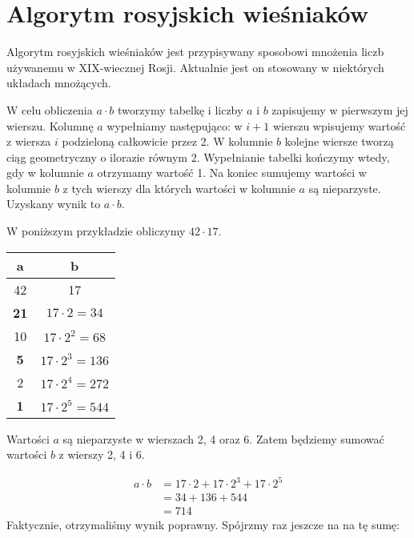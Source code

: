 \section{Algorytm rosyjskich wieśniaków}

\label{sec:wiesniakow}

Algorytm rosyjskich wieśniaków jest przypisywany sposobowi mnożenia liczb używanemu w XIX-wiecznej Rosji.
Aktualnie jest on stosowany w niektórych układach mnożących.

W celu obliczenia $a \cdot b$ tworzymy tabelkę i liczby $a$ i $b$ zapisujemy w pierwszym jej wierszu.
Kolumnę $a$ wypełniamy następująco: w $i+1$ wierszu wpisujemy wartość z wiersza $i$ podzieloną całkowicie przez 2.
W kolumnie $b$ kolejne wiersze tworzą ciąg geometryczny o ilorazie równym 2.
Wypełnianie tabelki kończymy wtedy, gdy w kolumnie $a$ otrzymamy wartość 1.
Na koniec sumujemy wartości w kolumnie $b$ z tych wierszy dla których wartości w kolumnie $a$ są nieparzyste.
Uzyskany wynik to $a \cdot b$.

W poniższym przykładzie obliczymy $42 \cdot 17$.

\begin{center}
\begin{tabular}{ c|c } 

 a & b \\ 
 \hline
 42 & 17 \\ 
 \textbf{21} & $17 \cdot 2 = 34$ \\
 10 & $17 \cdot 2^2 = 68$ \\
 \textbf{5}  & $17 \cdot 2^3 = 136$ \\
 2  & $17 \cdot 2^4 = 272$ \\
 \textbf{1}  & $17 \cdot 2^5 = 544$ \\

\end{tabular}
\end{center}
Wartości $a$ są nieparzyste w wierszach 2, 4 oraz 6. Zatem będziemy sumować wartości $b$ z wierszy 2, 4 i 6.

\begin{equation*} 
\begin{split}
a \cdot b &= 17\cdot2 + 17\cdot2^3 + 17\cdot2^5 \\
&= 34 + 136 + 544 \\
&= 714
\end{split}
\end{equation*}
Faktycznie, otrzymaliśmy wynik poprawny. Spójrzmy raz jeszcze na na tę sumę:

